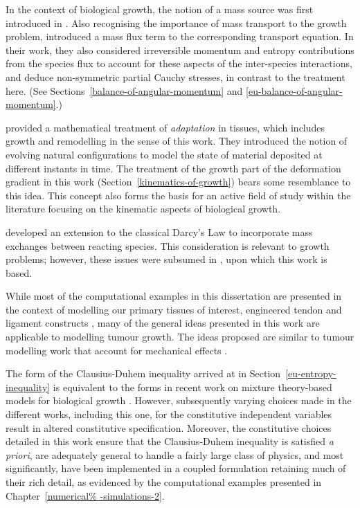 In the context of biological growth, the notion of a mass source was
first introduced in \citet{CowinHegedus:76}. Also recognising the
importance of mass transport to the growth problem, \citet{Epstein%
  Maugin:2000} introduced a mass flux term to the corresponding
transport equation. In their work, they also considered irreversible
momentum and entropy contributions from the species flux to account
for these aspects of the inter-species interactions, and deduce
non-symmetric partial Cauchy stresses, in contrast to the treatment
here. (See Sections~\ref{balance-of-angular-momentum} and
\ref{eu-balance-of-angular-momentum}.)

\citet{HumphreyRajagopal:02} provided a mathematical treatment of
\emph{adaptation} in tissues, which includes growth and remodelling in
the sense of this work. They introduced the notion of evolving natural
configurations to model the state of material deposited at different
instants in time. The treatment of the growth part of the deformation
gradient in this work (Section~\ref{kinematics-of-growth}) bears some
resemblance to this idea. This concept also forms the basis for an
active field of study within the literature \citep{Skalak:81,
  SkalakHoger:96, Klischetal:2001, TaberHumphrey:2001,
  LubardaHoger:02, AmbrosiMollica:2002} focusing on the kinematic
aspects of biological growth.

\citet{PreziosiFarina:2002} developed an extension to the classical
Darcy's Law to incorporate mass exchanges between reacting
species. This consideration is relevant to growth problems; however,
these issues were subsumed in \citet{growthpaper}, upon which this
work is based.

While most of the computational examples in this dissertation are
presented in the context of modelling our primary tissues of interest,
engineered tendon and ligament constructs \citep{Calve:04,ma:07}, many
of the general ideas presented in this work are applicable to
modelling tumour growth. The ideas proposed are similar to tumour
modelling work that account for mechanical effects \citep{Jackson%
  -Byrne:02,Byrneetal:06}.

The form of the Clausius-Duhem inequality arrived at in
Section~\ref{eu-entropy-inequality} is equivalent to the forms in
recent work on mixture theory-based models for biological growth
\citep{loret05, ateshian07}. However, subsequently varying choices
made in the different works, including this one, for the constitutive
independent variables result in altered constitutive
specification. Moreover, the constitutive choices detailed in this
work ensure that the Clausius-Duhem inequality is satisfied {\em a
  priori}, are adequately general to handle a fairly large class of
physics, and most significantly, have been implemented in a coupled
formulation retaining much of their rich detail, as evidenced by the
computational examples presented in Chapter~\ref{numerical%
  -simulations-2}.

